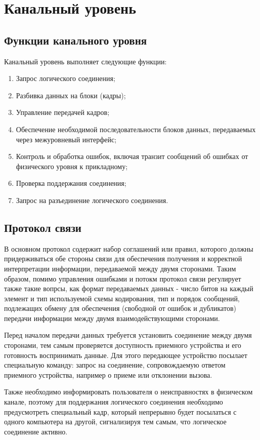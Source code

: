 \documentclass[russian,utf8,simple,emptystyle]{eskdtext}
\begin{document}
\section{Канальный уровень}
\subsection{Функции канального уровня}
Канальный уровень выполняет следующие функции:
\begin{enumerate}
\item Запрос логического соединения;
\item Разбивка данных на блоки (кадры);
\item Управление передачей кадров;
\item Обеспечение необходимой последовательности блоков данных, передаваемых через межуровневый интерфейс;
\item Контроль и обработка ошибок, включая транзит сообщений об ошибках от физического уровня к прикладному;
\item Проверка поддержания соединения;
\item Запрос на разъединение логического соединения.
\end{enumerate}

\subsection{Протокол связи}
В основном протокол содержит набор соглашений или правил, которого должны придерживаться обе стороны связи для обеспечения получения и корректной интерпретации информации, передаваемой между двумя сторонами. Таким образом, помимо управления ошибками и потокм протокол связи регулирует также такие вопрсы, как формат передаваемых данных - число битов на каждый элемент и тип используемой схемы кодирования, тип и порядок сообщений, подлежащих обмену для обеспечения (свободной от ошибок и дубликатов) передачи информации между двумя взаимодействующими сторонами.

Перед началом передачи данных требуется установить соединение между двумя сторонами, тем самым проверяется доступность приемного устройства и его готовность воспринимать данные. Для этого передающее устройство посылает специальную команду: запрос на соединение, сопровождаемую ответом приемного устройства, например о приеме или отклонении вызова.

Также необходимо информировать пользователя о неисправностях в физическом канале, поэтому для поддержания логического соединения необходимо предусмотреть специальный кадр, который непрерывно будет посылаться с одного компьютера на другой, сигнализируя тем самым, что логическое соединение активно.
\end{document}
